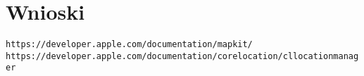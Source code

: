 \documentclass[a4paper,11pt,titlepage]{article}
\begin{document}
\section{Wnioski}

\newpage
{}
\listoffigures
\newpage

\begin{thebibliography}{9}
\verb|https://developer.apple.com/documentation/mapkit/|
\verb|https://developer.apple.com/documentation/corelocation/cllocationmanager|



\end{thebibliography}
\end{document}
